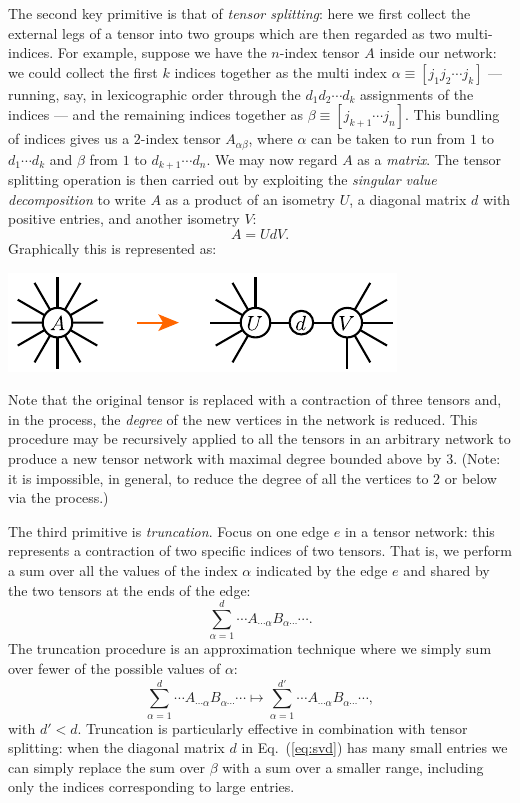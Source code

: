 \documentclass[twocolumn,lengthcheck,superscriptaddress]{revtex4-1}
\theoremstyle{definition}
\theoremstyle{remark}
\begin{document}
The second key primitive is that of \emph{tensor splitting}: here we first collect the external legs of a tensor into two groups which are then regarded as two multi-indices. For example, suppose we have the $n$-index tensor $A$ inside our network: we could collect the first $k$ indices together as the multi index  $\alpha \equiv [j_1j_2 \cdots j_k]$ --- running, say, in lexicographic order through the $d_1d_2\cdots d_k$ assignments of the indices  --- and the remaining indices together as $\beta \equiv [j_{k+1}\cdots j_n]$. This bundling of indices gives us a $2$-index tensor $A_{\alpha\beta}$, where $\alpha$ can be taken to run from $1$ to $d_1\cdots d_k$ and $\beta$ from $1$ to $d_{k+1}\cdots d_n$. We may now regard $A$ as a \emph{matrix}. The tensor splitting operation is then carried out by exploiting the \emph{singular value decomposition} \cite{horn:1990a} to write $A$ as a product of an isometry $U$, a diagonal matrix $d$ with positive entries, and another isometry $V$: 
\begin{equation}\label{eq:svd}
	A = UdV.
\end{equation}
Graphically this is represented as:
\begin{center}
\includegraphics{tensorsplitting.pdf}
\end{center}
Note that the original tensor is replaced with a contraction of three tensors and, in the process, the \emph{degree} of the new vertices in the network is reduced. This procedure may be recursively applied to all the tensors in an arbitrary network to produce a new tensor network with maximal degree bounded above by $3$. (Note: it is impossible, in general, to reduce the degree of all the vertices to $2$ or below via the process.)

The third primitive is \emph{truncation}. Focus on one edge $e$ in a tensor network: this represents a contraction of two specific indices of two tensors. That is, we perform a sum over all the values of the index $\alpha$ indicated by the edge $e$ and shared by the two tensors at the ends of the edge:
\begin{equation}
	\sum_{\alpha = 1}^{d} \cdots A_{\cdots \alpha} B_{\alpha \cdots} \cdots.
\end{equation}
The truncation procedure is an approximation technique where we simply sum over fewer of the possible values of $\alpha$:
\begin{equation}
	\sum_{\alpha = 1}^{d} \cdots A_{\cdots \alpha} B_{\alpha \cdots} \cdots \mapsto \sum_{\alpha = 1}^{d'} \cdots A_{\cdots \alpha} B_{\alpha \cdots} \cdots,
\end{equation}
with $d' < d$. Truncation is particularly effective in combination with tensor splitting: when the diagonal matrix $d$ in Eq.~(\ref{eq:svd}) has many small entries we can simply replace the sum over $\beta$ with a sum over a smaller range, including only the indices corresponding to large entries.
\end{document}
